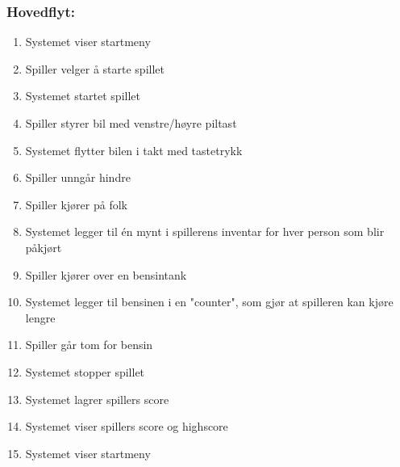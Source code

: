\documentclass[12pt]{report}
\begin{document}
\subsubsection*{Hovedflyt:}
\begin{enumerate}
\item Systemet viser startmeny
\item Spiller velger {\aa} starte spillet
\item Systemet startet spillet
\item Spiller styrer bil med venstre/h{\o}yre piltast
\item Systemet flytter bilen i takt med tastetrykk
\item Spiller unng{\aa}r hindre
\item Spiller kj{\o}rer p{\aa} folk
\item Systemet legger til én mynt i spillerens inventar for hver person som blir p{\aa}kj{\o}rt
\item Spiller kj{\o}rer over en bensintank
\item Systemet legger til bensinen i en "counter", som gj{\o}r at spilleren kan kj{\o}re lengre
\item Spiller g{\aa}r tom for bensin
\item Systemet stopper spillet
\item Systemet lagrer spillers score
\item Systemet viser spillers score og highscore
\item Systemet viser startmeny
\end{enumerate}
\pagebreak
\end{document}
